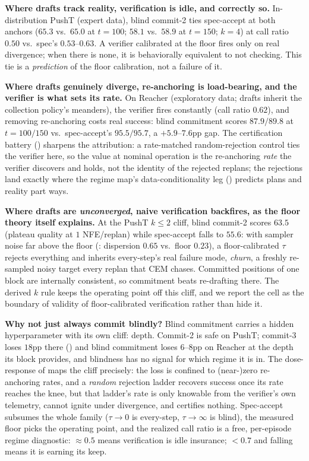 \documentclass{article}
\begin{document}
\textbf{Where drafts track reality, verification is idle, and correctly so.}
In-distribution PushT (expert data), blind commit-2 ties spec-accept at both
anchors ($65.3$ vs.\ $65.0$ at $t{=}100$; $58.1$ vs.\ $58.9$ at $t{=}150$; $k{=}4$)
at call ratio $0.50$ vs.\ spec's $0.53$--$0.63$. A verifier calibrated at the floor
fires only on real divergence; when there is none, it is behaviorally equivalent to
not checking. This tie is a \emph{prediction} of the floor calibration, not a
failure of it.

\textbf{Where drafts genuinely diverge, re-anchoring is load-bearing, and the
verifier is what sets its rate.} On Reacher (exploratory data; drafts inherit the
collection policy's meanders), the verifier fires constantly (call ratio $0.62$),
and removing re-anchoring costs real success: blind commitment scores $87.9/89.8$
at $t{=}100/150$ vs.\ spec-accept's $95.5/95.7$, a $+5.9$--$7.6$pp gap. The
certification battery () sharpens the attribution: a
rate-matched random-rejection control ties the verifier here, so the value at
nominal operation is the re-anchoring \emph{rate} the verifier discovers and
holds, not the identity of the rejected replans; the rejections land exactly
where the regime map's data-conditionality leg () predicts
plans and reality part ways.

\textbf{Where drafts are \emph{unconverged}, naive verification backfires, as the
floor theory itself explains.} At the PushT $k{\leq}2$ cliff, blind commit-2
scores $63.5$ (plateau quality at $1$ NFE/replan) while spec-accept falls to $55.6$:
with sampler noise far above the floor (: dispersion $0.65$ vs.\
floor $0.23$), a floor-calibrated $\tau$ rejects everything and inherits
every-step's real failure mode, \emph{churn}, a freshly re-sampled noisy target
every replan that CEM chases. Committed positions of one block are internally
consistent, so commitment beats re-drafting there. The derived $k$ rule keeps the
operating point off this cliff, and we report the cell as the boundary of validity
of floor-calibrated verification rather than hide it.

\textbf{Why not just always commit blindly?} Blind commitment carries a hidden
hyperparameter with its own cliff: depth. Commit-2 is safe on PushT; commit-3 loses
$18$pp there (\Cref{sec:negatives}) and blind commitment loses $6$--$8$pp on Reacher
at the depth its block provides, and blindness has no signal for which regime it
is in. The dose-response of \Cref{sec:results-cert} maps the cliff precisely: the
loss is confined to (near-)zero re-anchoring rates, and a \emph{random} rejection
ladder recovers success once its rate reaches the knee, but that ladder's rate is
only knowable from the verifier's own telemetry, cannot ignite under divergence,
and certifies nothing. Spec-accept subsumes the whole family ($\tau{\to}0$ is
every-step, $\tau{\to}\infty$ is blind), the measured floor picks the operating
point, and the realized call ratio is a free, per-episode regime diagnostic:
${\approx}0.5$ means verification is idle insurance; ${<}0.7$ and falling means it
is earning its keep.
\end{document}
